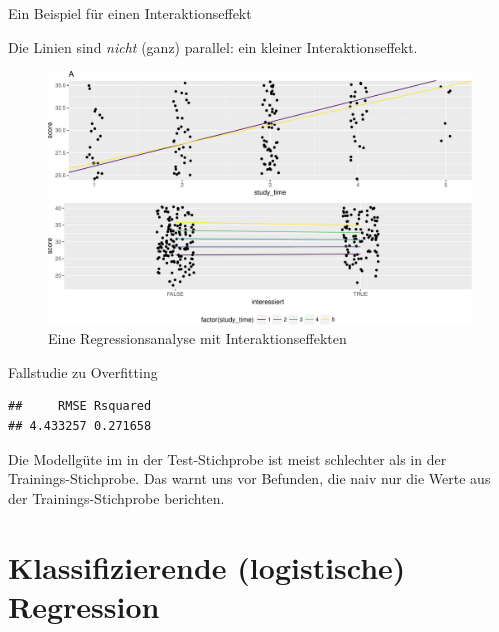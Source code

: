 \begin{frame}{Ein Beispiel für einen Interaktionseffekt}

Die Linien sind \emph{nicht} (ganz) parallel: ein kleiner
Interaktionseffekt.

\begin{figure}

{\centering \includegraphics[width=0.8\linewidth]{PraDa_Folien_nm_2_files/figure-beamer/interakt-stats-test-1} 

}

\caption{Eine Regressionsanalyse mit Interaktionseffekten}\label{fig:interakt-stats-test}
\end{figure}

\end{frame}

\begin{frame}[fragile]{Fallstudie zu Overfitting}

\begin{Shaded}
\begin{Highlighting}[]
\OperatorTok{::}\NormalTok{(}\OperatorTok{$}
\end{Highlighting}
\end{Shaded}

\begin{verbatim}
##     RMSE Rsquared 
## 4.433257 0.271658
\end{verbatim}

Die Modellgüte im in der Test-Stichprobe ist meist schlechter als in der
Trainings-Stichprobe. Das warnt uns vor Befunden, die naiv nur die Werte
aus der Trainings-Stichprobe berichten.

\end{frame}

\section{Klassifizierende (logistische)
Regression}\label{klassifizierende-logistische-regression}

